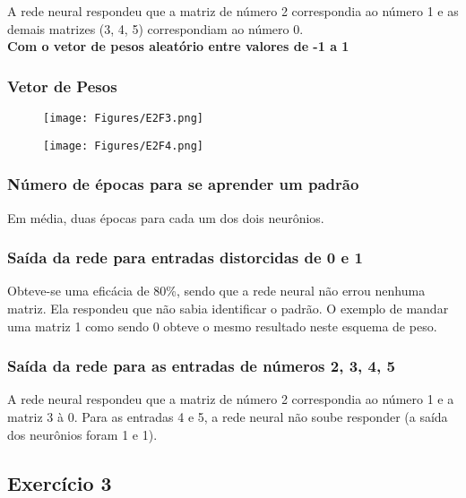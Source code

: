\documentclass[hidelinks,12pt]{article}
\begin{document}
			A rede neural respondeu que a matriz de número 2 correspondia ao número 1 e as demais matrizes (3, 4, 5) correspondiam ao número 0.\\
			
		\newpage
		\textbf{\large Com o vetor de pesos aleatório entre valores de -1 a 1}
		\subsubsection{Vetor de Pesos}
			
		\begin{figure}[!h]
			\centering
			\texttt{[image: Figures/E2F3.png]}
		\end{figure}
		
		\begin{figure}[!h]
			\centering
			\texttt{[image: Figures/E2F4.png]}
		\end{figure}
			
		\subsubsection{Número de épocas para se aprender um padrão}
			
			Em média, duas épocas para cada um dos dois neurônios.
			
		\subsubsection{Saída da rede para entradas distorcidas de 0 e 1}
		
		Obteve-se uma eficácia de 80\%, sendo que a rede neural não errou nenhuma matriz. Ela respondeu que não sabia identificar o padrão.
		O exemplo de mandar uma matriz 1 como sendo 0 obteve o mesmo resultado neste esquema de peso.
		
		\subsubsection{Saída da rede para as entradas de números 2, 3, 4, 5}
		
		A rede neural respondeu que a matriz de número 2 correspondia ao número 1 e a matriz 3 à 0. Para as entradas 4 e 5, a rede neural não soube responder (a saída dos neurônios foram 1 e 1).
		
	\subsection{Exercício 3}
		
\end{document}
